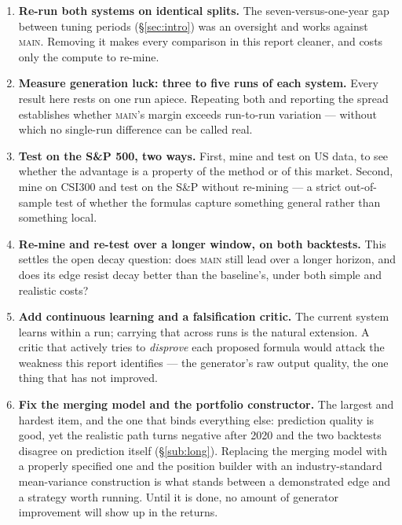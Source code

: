 \documentclass[11pt]{article}
\newcommand{\main}{\textsc{main}}
\begin{document}
\begin{enumerate}[leftmargin=1.6em,itemsep=0.3em]
  \item \textbf{Re-run both systems on identical splits.} The seven-versus-one-year gap
        between tuning periods (\S\ref{sec:intro}) was an oversight and works against
        \main{}. Removing it makes every comparison in this report cleaner, and costs
        only the compute to re-mine.
  \item \textbf{Measure generation luck: three to five runs of each system.} Every
        result here rests on one run apiece. Repeating both and reporting the spread
        establishes whether \main{}'s margin exceeds run-to-run variation --- without
        which no single-run difference can be called real.
  \item \textbf{Test on the S\&P 500, two ways.} First, mine and test on US data, to see
        whether the advantage is a property of the method or of this market. Second,
        mine on CSI300 and test on the S\&P without re-mining --- a strict
        out-of-sample test of whether the formulas capture something general rather
        than something local.
  \item \textbf{Re-mine and re-test over a longer window, on both backtests.} This
        settles the open decay question: does \main{} still lead over a longer horizon,
        and does its edge resist decay better than the baseline's, under both simple
        and realistic costs?
  \item \textbf{Add continuous learning and a falsification critic.} The current system
        learns within a run; carrying that across runs is the natural extension. A
        critic that actively tries to \emph{disprove} each proposed formula would attack
        the weakness this report identifies --- the generator's raw output quality,
        the one thing that has not improved.
  \item \textbf{Fix the merging model and the portfolio constructor.} The largest and
        hardest item, and the one that binds everything else: prediction quality is
        good, yet the realistic path turns negative after 2020 and the two backtests
        disagree on prediction itself (\S\ref{sub:long}). Replacing the merging model
        with a properly specified one and the position builder with an industry-standard
        mean-variance construction is what stands between a demonstrated edge and a
        strategy worth running. Until it is done, no amount of generator improvement
        will show up in the returns.
\end{enumerate}
\end{document}
